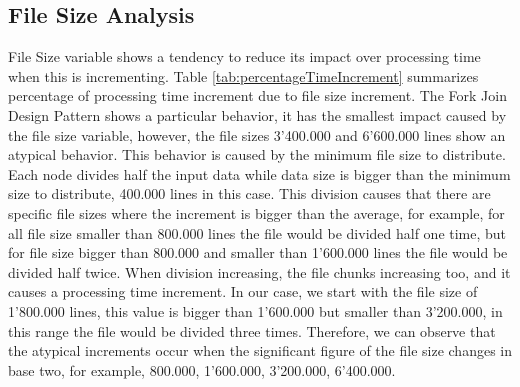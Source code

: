 \subsection{File Size Analysis}
File Size variable shows a tendency to reduce its impact over processing time when this is incrementing. Table \ref{tab:percentageTimeIncrement} summarizes percentage of processing time increment due to file size increment. The Fork Join Design Pattern shows a particular behavior, it has the smallest impact caused by the file size variable, however, the file sizes 3'400.000 and 6'600.000 lines show an atypical behavior. This behavior is caused by the minimum file size to distribute. Each node divides half the input data while data size is bigger than the minimum size to distribute, 400.000 lines in this case. This division causes that there are specific file sizes where the increment is bigger than the average, for example, for all file size smaller than 800.000 lines the file would be divided half one time, but for file size bigger than 800.000 and smaller than 1'600.000 lines the file would be divided half twice. When division increasing, the file chunks increasing too, and it causes a processing time increment. In our case, we start with the file size of 1'800.000 lines, this value is bigger than 1'600.000 but smaller than 3'200.000, in this range the file would be divided three times. Therefore, we can observe that the atypical increments occur when the significant figure of the file size changes in base two, for example, 800.000, 1'600.000, 3'200.000, 6'400.000. 

